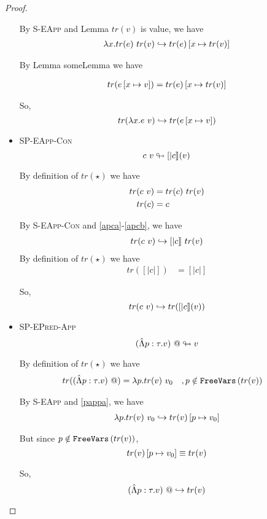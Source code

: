\documentclass[10pt,a4paper]{article}
\newcommand\highlight[2]{{\setlength\fboxsep{1pt}\colorbox{#1}{#2}}}
\def\NV{\highlight{colorNV}}
\newcommand\trans[1]{\ensuremath{tr (#1)}}
\newcommand\rulename[1]{\textsc{#1}}
\newcommand\peval[2]{\ensuremath{#1 \looparrowright #2 }}
\newcommand\eval[2]{\ensuremath{#1 \hookrightarrow #2 }}
\begin{document}
\begin{proof}
\begin{itemize}
By  \rulename{S-EApp} and Lemma \NV{\trans{v} is value}, we have
\begin{align}
\eval
{\eapp{\efun{x}{\trans{e}}}{\trans{v}}}
{{{\trans{e}}}\sub{x}{\trans{v}}} \label{appb}
\end{align}

By Lemma \NV{someLemma} we have 

\begin{align*}
\trans{{e}\sub{x}{v}} = \trans{e}\sub{x}{\trans{v}}  
\end{align*}

So, 
$$
\eval
{\trans{\eapp{\efun{x}{{e}}}{{v}}}}
{\trans{e\sub{x}{v}}}
$$

\item \rulename{SP-EApp-Con} $$\peval{\eapp{c}{v}}{[|c|](v)}$$

By definition of \trans{\star} we have 
\begin{align}
\trans{\eapp{c}{v}} &= \eapp{\trans{c}}{\trans{v}} \label{apca}\\
\trans{c} &= c \label{apcb}
\end{align}

By  \rulename{S-EApp-Con} and \ref{apca}-\ref{apcb}, we have
\begin{align}
\eval{\trans{\eapp{c}{{v}}}}
{\eapp{[|c|]}{\trans{v}}} \label{appb}
\end{align}
By definition of \trans{\star} we have 
\begin{align}
\trans{[|c|]} &= [|c|] \label{apcb}
\end{align}

So, $$\eval{\trans{\eapp{c}{v}}}{\trans{[|c|](v)}}$$

\item \rulename{SP-EPred-App} $$\peval{\epapp{(\epabs{p}{\tau}{v})}}{v}$$

By definition of \trans{\star} we have 
\begin{align}
\trans{\epapp{(\epabs{p}{\tau}{v})}} &= \eapp{\efun{p}{\trans{v}}}{v_0}&&, p \notin \fv{\trans{v}} \label{pappa}
\end{align}

By  \rulename{S-EApp} and \ref{pappa}, we have
\begin{align}
\eval{\eapp{\efun{p}{\trans{v}}}{v_0}} {\trans{v}\sub{p}{v_0}}
\end{align}

But since $p \notin \fv{\trans{v}}$, 
$$
{\trans{v}\sub{p}{v_0}} \equiv \trans{v} 
$$

So, $$\eval{\epapp{(\epabs{p}{\tau}{v})}}{\trans{v}}$$


\end{itemize}
\end{proof}
\end{document}
